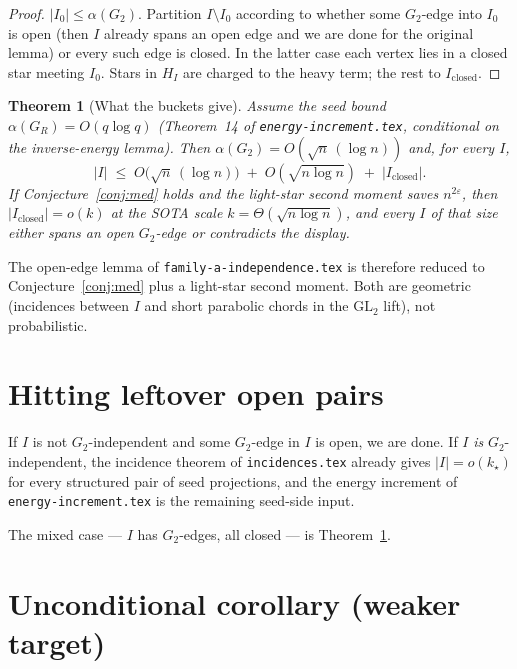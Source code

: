 \documentclass[11pt]{article}
\newtheorem{theorem}{Theorem}
\theoremstyle{definition}
\newcommand{\eps}{\varepsilon}
\begin{document}
\begin{proof}
$|I_0|\le\alpha(G_2)$.
Partition $I\setminus I_0$ according to whether some $G_2$-edge into $I_0$ is open (then $I$ already spans an open edge and we are done for the original lemma) or every such edge is closed.
In the latter case each vertex lies in a closed star meeting $I_0$.
Stars in $H_I$ are charged to the heavy term; the rest to $I_{\mathrm{closed}}$.
\end{proof}

\begin{theorem}[What the buckets give]\label{thm:buckets}
Assume the seed bound $\alpha(G_R)=O(q\log q)$ (Theorem~14 of \texttt{energy-increment.tex}, conditional on the inverse-energy lemma).
Then $\alpha(G_2)=O(\sqrt{n}\,(\log n))$ and, for every $I$,
\[
  |I|
  \;\le\;
  O\bigl(\sqrt{n}\,(\log n)\bigr)
  \;+\;
  O(\sqrt{n\log n})
  \;+\;
  |I_{\mathrm{closed}}|.
\]
If Conjecture~\ref{conj:med} holds and the light-star second moment saves $n^{2\eps}$, then $|I_{\mathrm{closed}}|=o(k)$ at the SOTA scale $k=\Theta(\sqrt{n\log n})$, and every $I$ of that size either spans an open $G_2$-edge or contradicts the display.
\end{theorem}

The open-edge lemma of \texttt{family-a-independence.tex} is therefore reduced to Conjecture~\ref{conj:med} plus a light-star second moment.
Both are geometric (incidences between $I$ and short parabolic chords in the $\mathrm{GL}_2$ lift), not probabilistic.

\section{Hitting leftover open pairs}

If $I$ is not $G_2$-independent and some $G_2$-edge in $I$ is open, we are done.
If $I$ \emph{is} $G_2$-independent, the incidence theorem of \texttt{incidences.tex} already gives $|I|=o(k_{\star})$ for every structured pair of seed projections, and the energy increment of \texttt{energy-increment.tex} is the remaining seed-side input.

The mixed case --- $I$ has $G_2$-edges, all closed --- is Theorem~\ref{thm:buckets}.

\section{Unconditional corollary (weaker target)}
\end{document}
